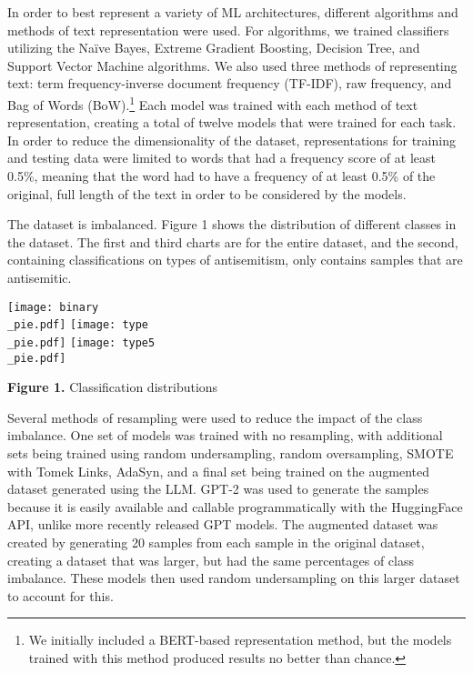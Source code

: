 \documentclass[runningheads]{llncs}
\newenvironment{nscenter}
 {\parskip=0pt\par\nopagebreak\centering}
 {\par\noindent\ignorespacesafterend}
\begin{document}
In order to best represent a variety of ML architectures, different algorithms and methods of text representation were used. For algorithms, we trained classifiers utilizing the Naïve Bayes, Extreme Gradient Boosting, Decision Tree, and Support Vector Machine algorithms. We also used three methods of representing text: term frequency-inverse document frequency (TF-IDF), raw frequency, and Bag of Words (BoW).\footnote{We initially included a BERT-based representation method, but the models trained with this method produced results no better than chance.} Each model was trained with each method of text representation, creating a total of twelve models that were trained for each task. In order to reduce the dimensionality of the dataset, representations for training and testing data were limited to words that had a frequency score of at least 0.5\%, meaning that the word had to have a frequency of at least 0.5\% of the original, full length of the text in order to be considered by the models.

The dataset is imbalanced. Figure 1 shows the distribution of different classes in the dataset. The first and third charts are for the entire dataset, and the second, containing classifications on types of antisemitism, only contains samples that are antisemitic.\\

\begin{nscenter}
\texttt{[image: binary\\\_pie.pdf]}
\texttt{[image: type\\\_pie.pdf]}
\texttt{[image: type5\\\_pie.pdf]}

{\bf Figure 1.} Classification distributions
\end{nscenter}

Several methods of resampling were used to reduce the impact of the class imbalance. One set of models was trained with no resampling, with additional sets being trained using random undersampling, random oversampling, SMOTE with Tomek Links, AdaSyn, and a final set being trained on the augmented dataset generated using the LLM. GPT-2 was used to generate the samples because it is easily available and callable programmatically with the HuggingFace API, unlike more recently released GPT models. The augmented dataset was created by generating 20 samples from each sample in the original dataset, creating a dataset that was larger, but had the same percentages of class imbalance. These models then used random undersampling on this larger dataset to account for this.
\end{document}
